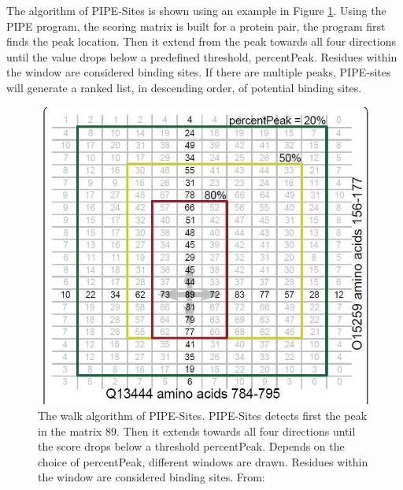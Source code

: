 The algorithm of PIPE-Sites is shown using an example in Figure \ref{fig_PIPE-Sites}. Using the PIPE program, the scoring matrix is built for a protein pair, the program first finds the peak location. Then it extend from the peak towards all four directions until the value drops below a predefined threshold, percentPeak. Residues within the window are considered binding sites. If there are multiple peaks, PIPE-sites will generate a ranked list, in descending order, of potential binding sites.

\begin{figure}[h!]
\begin{center}
\includegraphics[height =9 cm]{img/PIPE_site_cut.JPG}
\caption[The walk algorithm of PIPE-Sites]{The walk algorithm of PIPE-Sites. PIPE-Sites detects first the peak in the matrix 89. Then it extends towards all four directions until the score drops below a threshold percentPeak. Depends on the choice of percentPeak, different windows are drawn. Residues within the window are considered binding sites. From: \cite{amos2011binding}  \label{fig_PIPE-Sites}}
\end{center}
\end{figure} 


